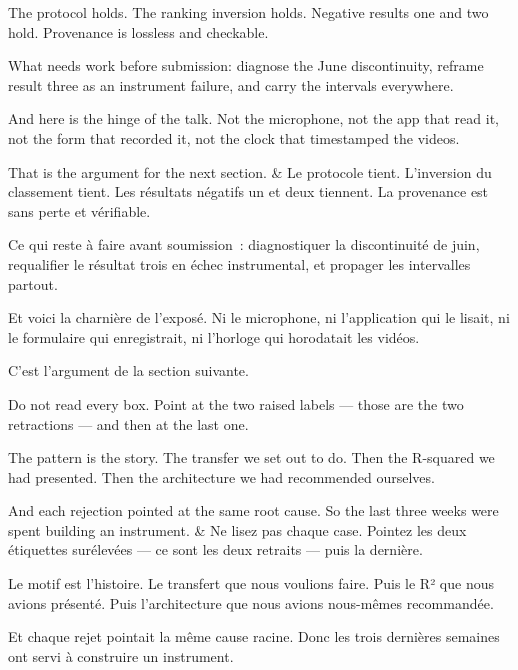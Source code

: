 \documentclass[10pt,a4paper]{article}
\begin{document}
\begin{say}
The protocol holds. The ranking inversion holds. Negative results one and two
hold. Provenance is lossless and checkable.

What needs work before submission: diagnose the June discontinuity, reframe result
three as an instrument failure, and carry the intervals everywhere.

And here is the hinge of the talk.  Not the microphone,
not the app that read it, not the form that recorded it, not the clock that
timestamped the videos.

That is the argument for the next section.
&
Le protocole tient. L'inversion du classement tient. Les résultats négatifs un et
deux tiennent. La provenance est sans perte et vérifiable.

Ce qui reste à faire avant soumission~: diagnostiquer la discontinuité de juin,
requalifier le résultat trois en échec instrumental, et propager les intervalles
partout.

Et voici la charnière de l'exposé.  Ni le
microphone, ni l'application qui le lisait, ni le formulaire qui enregistrait, ni
l'horloge qui horodatait les vidéos.

C'est l'argument de la section suivante.
\end{say}

\clearpage

\begin{say}
Do not read every box. Point at the two raised labels --- those are the two
retractions --- and then at the last one.

The pattern is the story.  The transfer we set out to do. Then the R-squared we had presented. Then
the architecture we had recommended ourselves.

And each rejection pointed at the same root cause. So the last three weeks were
spent building an instrument.
&
Ne lisez pas chaque case. Pointez les deux étiquettes surélevées --- ce sont les
deux retraits --- puis la dernière.

Le motif est l'histoire.  Le transfert que nous voulions faire. Puis le R² que nous avions
présenté. Puis l'architecture que nous avions nous-mêmes recommandée.

Et chaque rejet pointait la même cause racine. Donc les trois dernières semaines
ont servi à construire un instrument.
\end{say}
\end{document}
